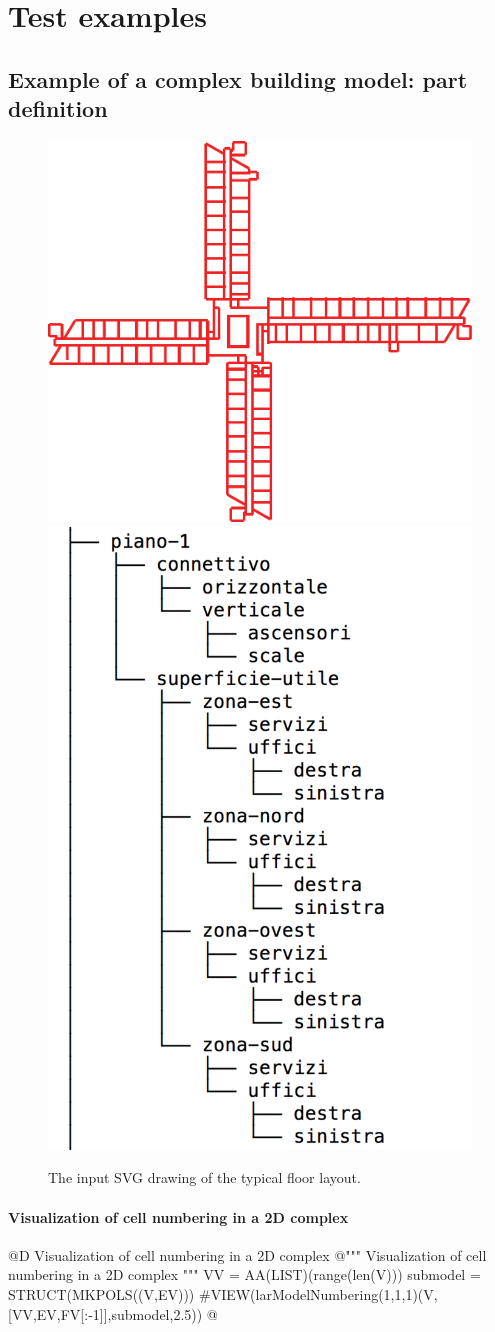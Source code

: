 \documentclass[11pt,oneside]{article}    %
\begin{document}
\section{Test examples}


\subsection{Example of a complex building model: part definition}


\begin{figure}[htbp] %
   \centering
   \includegraphics[width=0.55\linewidth]{images/croce} \hfill
   \includegraphics[width=0.35\linewidth]{images/croce2} 
   \caption{The input SVG drawing of the typical floor layout.}
   \label{fig:example}
\end{figure}


\paragraph{Visualization of cell numbering in a 2D complex}
@D Visualization of cell numbering in a 2D complex
@{""" Visualization of cell numbering in a 2D complex """
VV = AA(LIST)(range(len(V)))
submodel = STRUCT(MKPOLS((V,EV)))
#VIEW(larModelNumbering(1,1,1)(V,[VV,EV,FV[:-1]],submodel,2.5))
@}
\end{document}
